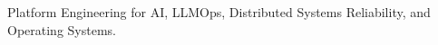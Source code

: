 
\begin{cvparagraph}
    Platform Engineering for AI, LLMOps, Distributed Systems Reliability, and Operating Systems.
\end{cvparagraph}